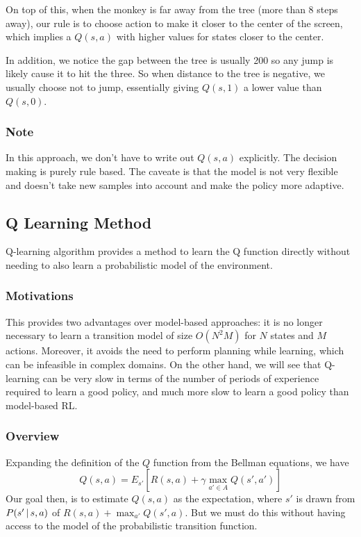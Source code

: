 \documentclass[submit]{harvardml}
\begin{document}
On top of this, when the monkey is far away from the tree (more than 8 steps away), our rule is to choose action to make it closer to the center of the screen, which implies a $Q(s,a)$ with higher values for states closer to the center.

In addition, we notice the gap between the tree is usually 200 so any jump is likely cause it to hit the three. So when distance to the tree is negative, we usually choose not to jump, essentially giving $Q(s,1)$ a lower value than $Q(s,0)$. 

\subsubsection{Note}
In this approach, we don't have to write out $Q(s,a)$ explicitly. The decision making is purely rule based. The caveate is that the model is not very flexible and doesn't take new samples into account and make the policy more adaptive.

\subsection{Q Learning Method}
Q-learning algorithm provides a method to learn the Q function directly without needing to also learn a probabilistic model of the environment. 

\subsubsection{Motivations}
This provides two advantages over model-based approaches: it is no longer necessary to learn a transition model of size $O(N^2M)$ for $N$ states and $M$ actions. Moreover, it avoids the need to perform planning while learning, which can be infeasible in complex domains. On the other hand, we will see that Q-learning can be very slow in terms of the number of periods of experience required to learn a good policy, and much more slow to learn a good policy than model-based RL.

\subsubsection{Overview}
Expanding the definition of the $Q$ function from the Bellman equations, we have
$$ Q(s,a) = E_{s'}\left[ R(s,a) + \gamma \max_{a'\in A} Q(s', a') \right] $$
Our goal then, is to estimate $Q(s,a)$ as the expectation, where $s'$ is drawn from $P(s'\,|\, s,a)$ of $R(s,a) + \max_{a'}Q(s',a)$. But we must do this without having access to the model of the probabilistic transition function.
\end{document}
